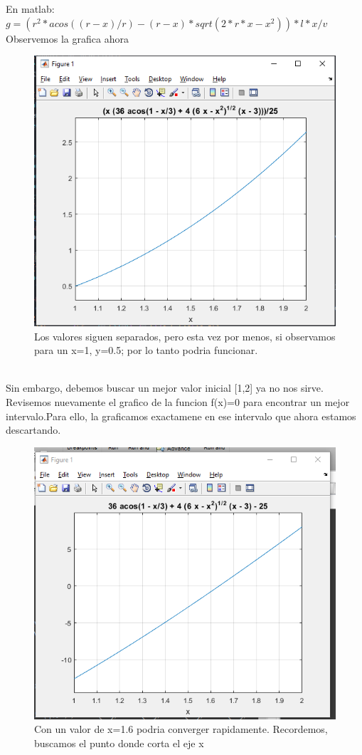 \documentclass{article}
\theoremstyle{mytheoremstyle}
\theoremstyle{mytheoremstyle}
\theoremstyle{myproblemstyle}
\begin{document}
En matlab:$g=(r^2*acos((r-x)/r)-(r-x)*sqrt(2*r*x-x^2))*l*x/v$
\\Observemos la grafica ahora 
\pagebreak
\begin{figure}[ht]
    \includegraphics[scale=0.8]{img/stf5.png}{\\Los valores siguen separados, pero esta vez por menos, si observamos para un x=1, y=0.5; por lo tanto podria funcionar.}
\end{figure}
\\Sin embargo, debemos buscar un mejor valor inicial [1,2] ya no nos sirve. Revisemos nuevamente el grafico de la funcion f(x)=0 para
encontrar un mejor intervalo.Para ello, la graficamos exactamene en ese intervalo que ahora estamos descartando.
\begin{figure}[ht]
    \includegraphics[scale=0.8]{img/stf6.png}{\\Con un valor de x=1.6 podria converger rapidamente. Recordemos, buscamos el punto donde corta el eje x}
\end{figure}
\end{document}

